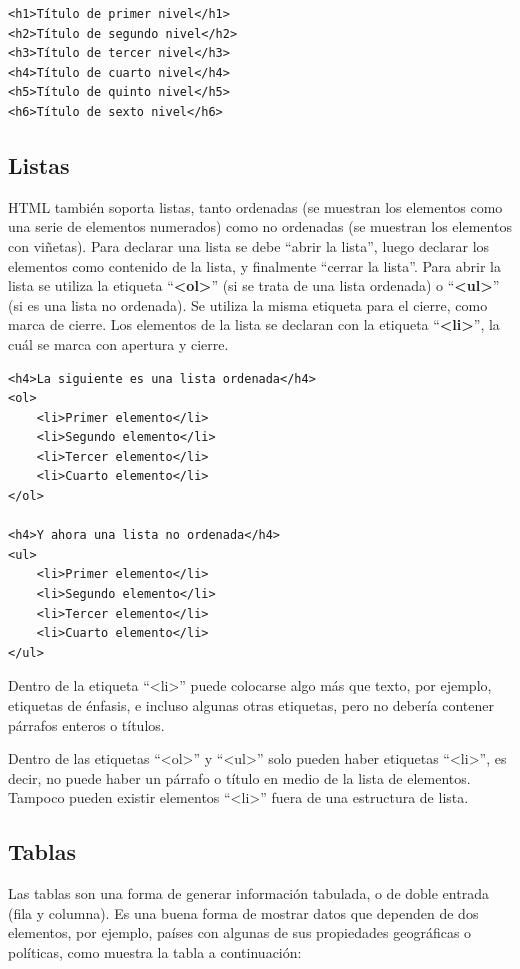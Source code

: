 \begin{lstlisting}[language=XHTML]
<h1>Título de primer nivel</h1>
<h2>Título de segundo nivel</h2>
<h3>Título de tercer nivel</h3>
<h4>Título de cuarto nivel</h4>
<h5>Título de quinto nivel</h5>
<h6>Título de sexto nivel</h6>
\end{lstlisting}

\subsection*{Listas}

HTML también soporta listas, tanto ordenadas (se muestran los elementos como una
serie de elementos numerados) como no ordenadas (se muestran los elementos con
viñetas). Para declarar una lista se debe ``abrir la lista'', luego declarar los
elementos como contenido de la lista, y finalmente ``cerrar la lista''. Para
abrir la lista se utiliza la etiqueta ``\textbf{<ol>}'' (si se trata de una
lista ordenada) o ``\textbf{<ul>}'' (si es una lista no ordenada). Se utiliza la
misma etiqueta para el cierre, como marca de cierre. Los elementos de la lista
se declaran con la etiqueta ``\textbf{<li>}'', la cuál se marca con apertura y
cierre.

\begin{lstlisting}[language=XHTML]
<h4>La siguiente es una lista ordenada</h4>
<ol>
    <li>Primer elemento</li>
    <li>Segundo elemento</li>
    <li>Tercer elemento</li>
    <li>Cuarto elemento</li>
</ol>

<h4>Y ahora una lista no ordenada</h4>
<ul>
    <li>Primer elemento</li>
    <li>Segundo elemento</li>
    <li>Tercer elemento</li>
    <li>Cuarto elemento</li>
</ul>
\end{lstlisting}

Dentro de la etiqueta ``<li>'' puede colocarse algo más que texto, por ejemplo,
etiquetas de énfasis, e incluso algunas otras etiquetas, pero no debería contener
párrafos enteros o títulos.

Dentro de las etiquetas ``<ol>'' y ``<ul>'' solo pueden haber etiquetas
``<li>'', es decir, no puede haber un párrafo o título en medio de la lista de
elementos. Tampoco pueden existir elementos ``<li>'' fuera de una estructura de
lista.

\subsection*{Tablas}

Las tablas son una forma de generar información tabulada, o de doble entrada
(fila y columna). Es una buena forma de mostrar datos que dependen de dos
elementos, por ejemplo, países con algunas de sus propiedades geográficas o
políticas, como muestra la tabla a continuación:

